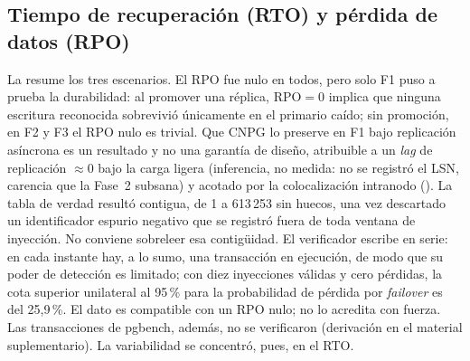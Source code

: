\subsection{Tiempo de recuperación (RTO) y pérdida de datos (RPO)}\label{sec:rtorpo}
La  resume los tres escenarios. El RPO fue nulo en todos, pero solo F1 puso a prueba la durabilidad: al promover una réplica, $\text{RPO}=0$ implica que ninguna escritura reconocida sobrevivió únicamente en el primario caído; sin promoción, en F2 y F3 el RPO nulo es trivial. Que CNPG lo preserve en F1 bajo replicación asíncrona es un resultado y no una garantía de diseño, atribuible a un \textit{lag} de replicación $\approx 0$ bajo la carga ligera  (inferencia, no medida: no se registró el LSN, carencia que la Fase~2 subsana) y acotado por la colocalización intranodo (). La tabla de verdad resultó contigua, de 1 a 613\,253 sin huecos, una vez descartado un identificador espurio negativo que se registró fuera de toda ventana de inyección. No conviene sobreleer esa contigüidad. El verificador escribe en serie: en cada instante hay, a lo sumo, una transacción en ejecución, de modo que su poder de detección es limitado; con diez inyecciones válidas y cero pérdidas, la cota superior unilateral al 95\,\% para la probabilidad de pérdida por \textit{failover} es del 25,9\,\%. El dato es compatible con un RPO nulo; no lo acredita con fuerza. Las transacciones de pgbench, además, no se verificaron (derivación en el material suplementario). La variabilidad se concentró, pues, en el RTO.

